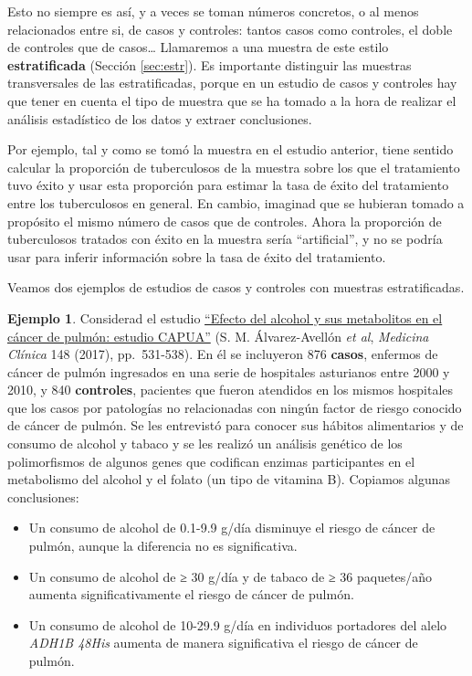 \documentclass[
]{book}
\theoremstyle{definition}
\theoremstyle{definition}
\newtheorem{example}{Ejemplo}[chapter]
\theoremstyle{definition}
\theoremstyle{definition}
\theoremstyle{remark}
\begin{document}
Esto no siempre es así, y a veces se toman números concretos, o al menos relacionados entre si, de casos y controles: tantos casos como controles, el doble de controles que de casos\ldots{} Llamaremos a una muestra de este estilo \textbf{estratificada} (Sección \ref{sec:estr}). Es importante distinguir las muestras transversales de las estratificadas, porque en un estudio de casos y controles hay que tener en cuenta el tipo de muestra que se ha tomado a la hora de realizar el análisis estadístico de los datos y extraer conclusiones.

Por ejemplo, tal y como se tomó la muestra en el estudio anterior, tiene sentido calcular la proporción de tuberculosos de la muestra sobre los que el tratamiento tuvo éxito y usar esta proporción para estimar la tasa de éxito del tratamiento entre los tuberculosos en general. En cambio, imaginad que se hubieran tomado a propósito el mismo número de casos que de controles. Ahora la proporción de tuberculosos tratados con éxito en la muestra sería ``artificial'', y no se podría usar para inferir información sobre la tasa de éxito del tratamiento.

Veamos dos ejemplos de estudios de casos y controles con muestras estratificadas.

\begin{example}
\protect\hypertarget{exm:CAPUA}{}\label{exm:CAPUA}Considerad el estudio \href{https://www.sciencedirect.com/science/article/pii/S0025775317300362}{``Efecto del alcohol y sus metabolitos en el cáncer de pulmón: estudio CAPUA''} (S. M. Álvarez-Avellón \emph{et al}, \emph{Medicina Clínica} 148 (2017), pp.~531-538). En él se incluyeron 876 \textbf{casos}, enfermos de cáncer de pulmón ingresados en una serie de hospitales asturianos entre 2000 y 2010, y 840 \textbf{controles}, pacientes que fueron atendidos en los mismos hospitales que los casos por patologías no relacionadas con ningún factor de riesgo conocido de cáncer de pulmón. Se les entrevistó para conocer sus hábitos alimentarios y de consumo de alcohol y tabaco y se les realizó un análisis genético de los polimorfismos de algunos genes que codifican enzimas participantes en el metabolismo del alcohol y el folato (un tipo de vitamina B). Copiamos algunas conclusiones:
\end{example}

\begin{itemize}
\item
  Un consumo de alcohol de 0.1-9.9 g/día disminuye el riesgo de cáncer de pulmón, aunque la diferencia no es significativa.
\item
  Un consumo de alcohol de ≥ 30 g/día y de tabaco de ≥ 36 paquetes/año aumenta significativamente el riesgo de cáncer de pulmón.
\item
  Un consumo de alcohol de 10-29.9 g/día en individuos portadores del alelo \emph{ADH1B 48His} aumenta de manera significativa el riesgo de cáncer de pulmón.
\end{itemize}
\end{document}
